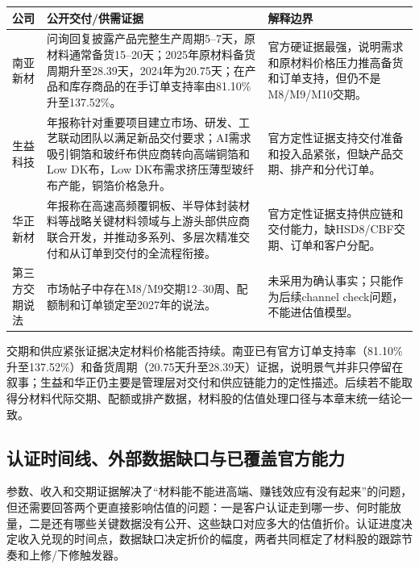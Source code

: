 \begin{exhibitbox}[图表3-15：交期与供应紧张代理]
\scriptsize
\begin{tabularx}{\textwidth}{L{1.8cm}X X}
\toprule
\textbf{公司} & \textbf{公开交付/供需证据} & \textbf{解释边界} \\
\midrule
南亚新材 & 问询回复披露产品完整生产周期5--7天，原材料通常备货15--20天；2025年原材料备货周期升至28.39天，2024年为20.75天；在产品和库存商品的在手订单支持率由81.10\%升至137.52\%。 & 官方硬证据最强，说明需求和原材料价格压力推高备货和订单支持，但仍不是M8/M9/M10交期。 \\
生益科技 & 年报称针对重要项目建立市场、研发、工艺联动团队以满足新品交付要求；AI需求吸引铜箔和玻纤布供应商转向高端铜箔和Low DK布，Low DK布需求挤压薄型玻纤布产能，铜箔价格急升。 & 官方定性证据支持交付准备和投入品紧张，但缺产品交期、排产和分代订单。 \\
华正新材 & 年报称在高速高频覆铜板、半导体封装材料等战略关键材料领域与上游头部供应商联合开发，并推动多系列、多层次精准交付和从订单到交付的全流程衔接。 & 官方定性证据支持供应链和交付能力，缺HSD8/CBF交期、订单和客户分配。 \\
第三方交期说法 & 市场帖子中存在M8/M9交期12--30周、配额制和订单锁定至2027年的说法。 & 未采用为确认事实；只能作为后续channel check问题，不能进估值模型。 \\
\bottomrule
\end{tabularx}
\end{exhibitbox}

交期和供应紧张证据决定材料价格能否持续。南亚已有官方订单支持率（81.10\%升至137.52\%）和备货周期（20.75天升至28.39天）证据，说明景气并非只停留在叙事；生益和华正仍主要是管理层对交付和供应链能力的定性描述。后续若不能取得分材料代际交期、配额或排产数据，材料股的估值处理口径与本章末统一结论一致。

\subsection{认证时间线、外部数据缺口与已覆盖官方能力}

参数、收入和交期证据解决了“材料能不能进高端、赚钱效应有没有起来”的问题，但还需要回答两个更直接影响估值的问题：一是客户认证走到哪一步、何时能放量，二是还有哪些关键数据没有公开、这些缺口对应多大的估值折价。认证进度决定收入兑现的时间点，数据缺口决定折价的幅度，两者共同框定了材料股的跟踪节奏和上修/下修触发器。

